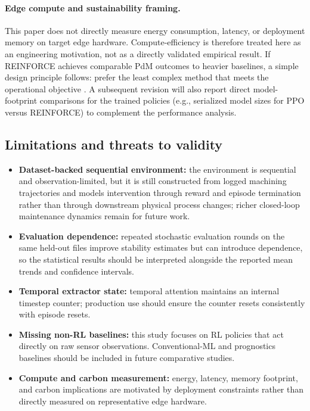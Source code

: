 \documentclass[sn-basic]{sn-jnl} %
\begin{document}
\paragraph{Edge compute and sustainability framing.}
This paper does not directly measure energy consumption, latency, or deployment memory on target edge hardware. Compute-efficiency is therefore treated here as an engineering motivation, not as a directly validated empirical result. If \textsc{REINFORCE} achieves comparable PdM outcomes to heavier baselines, a simple design principle follows: prefer the least complex method that meets the operational objective \cite{Schwartz2020, Strubell2019}. A subsequent revision will also report direct model-footprint comparisons for the trained policies (e.g., serialized model sizes for PPO versus \textsc{REINFORCE}) to complement the performance analysis.

\subsection{Limitations and threats to validity}
\begin{itemize}
	\item \textbf{Dataset-backed sequential environment:} the environment is sequential and observation-limited, but it is still constructed from logged machining trajectories and models intervention through reward and episode termination rather than through downstream physical process changes; richer closed-loop maintenance dynamics remain for future work.
	\item \textbf{Evaluation dependence:} repeated stochastic evaluation rounds on the same held-out files improve stability estimates but can introduce dependence, so the statistical results should be interpreted alongside the reported mean trends and confidence intervals.
	\item \textbf{Temporal extractor state:} temporal attention maintains an internal timestep counter; production use should ensure the counter resets consistently with episode resets.
	\item \textbf{Missing non-RL baselines:} this study focuses on RL policies that act directly on raw sensor observations. Conventional-ML and prognostics baselines should be included in future comparative studies.
	\item \textbf{Compute and carbon measurement:} energy, latency, memory footprint, and carbon implications are motivated by deployment constraints rather than directly measured on representative edge hardware.
\end{itemize}
\end{document}
